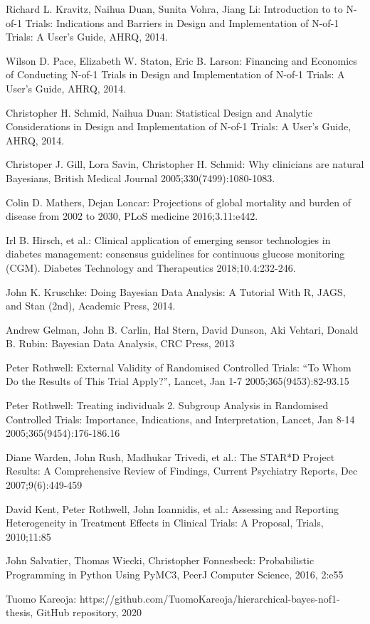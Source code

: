 \documentclass[12pt,a4paper,leqno]{report}
\theoremstyle{plain}
\theoremstyle{definition}
\theoremstyle{remark}
\begin{document}
\begin{thebibliography}{4}

    Richard L. Kravitz, Naihua Duan, Sunita Vohra, Jiang Li: Introduction to to
    N-of-1 Trials: Indications and Barriers in Design and Implementation of
    N-of-1 Trials: A User's Guide, AHRQ, 2014.

    Wilson D. Pace, Elizabeth W. Staton, Eric B. Larson: Financing and Economics
    of Conducting N-of-1 Trials in Design and Implementation of N-of-1 Trials: A
    User's Guide, AHRQ, 2014.

    Christopher H. Schmid, Naihua Duan: Statistical Design and Analytic
    Considerations in Design and Implementation of N-of-1 Trials: A User's
    Guide, AHRQ, 2014.

    Christoper J. Gill, Lora Savin, Christopher H. Schmid: Why clinicians are
    natural Bayesians, British Medical Journal 2005;330(7499):1080-1083.

    Colin D. Mathers, Dejan Loncar: Projections of global mortality and burden
    of disease from 2002 to 2030, PLoS medicine 2016;3.11:e442.

    Irl B. Hirsch, et al.: Clinical application of emerging sensor technologies
    in diabetes management: consensus guidelines for continuous glucose
    monitoring (CGM). Diabetes Technology and Therapeutics 2018;10.4:232-246.

    John K. Kruschke: Doing Bayesian Data Analysis: A Tutorial With R, JAGS, and Stan
    (2nd), Academic Press, 2014.

    Andrew Gelman, John B. Carlin, Hal Stern, David Dunson, Aki Vehtari, Donald B.
    Rubin: Bayesian Data Analysis, CRC Press, 2013

    Peter Rothwell: External Validity of Randomised Controlled Trials: “To Whom Do the
    Results of This Trial Apply?”, Lancet, Jan 1-7 2005;365(9453):82-93.15

    Peter Rothwell: Treating individuals 2. Subgroup Analysis in Randomised Controlled
    Trials: Importance, Indications, and Interpretation, Lancet, Jan 8-14
    2005;365(9454):176-186.16

    Diane Warden, John Rush, Madhukar Trivedi, et al.: The STAR*D Project Results: A Comprehensive Review of Findings, Current Psychiatry Reports, Dec 2007;9(6):449-459

    David Kent, Peter Rothwell, John Ioannidis, et al.: Assessing and Reporting Heterogeneity in
    Treatment Effects in Clinical Trials: A Proposal, Trials, 2010;11:85

    John Salvatier, Thomas Wiecki, Christopher Fonnesbeck: Probabilistic Programming in Python Using PyMC3, PeerJ Computer
    Science, 2016, 2:e55

    Tuomo Kareoja: https://github.com/TuomoKareoja/hierarchical-bayes-nof1-thesis, GitHub repository, 2020

\end{thebibliography}
\end{document}
